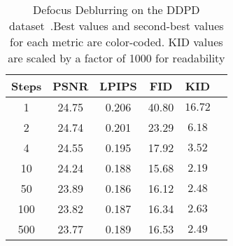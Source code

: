 \begin{table}[ht]
\small
\setlength{\tabcolsep}{3pt}
\centering
\caption{Defocus Deblurring on the DDPD dataset~\citep{abuolaim2020defocus}.\colorbox{red!15}{Best values} and \colorbox{blue!15}{second-best values} for each metric are color-coded. KID values are scaled by a factor of 1000 for readability}
\label{table:ddpd_results}
\begin{tabular}{cccccc}
\toprule
Steps	& PSNR	& LPIPS	    & FID & KID \\ \midrule
1	& \colorbox{red!15}{24.75}	& 0.206	& 40.80	& $16.72$\\
2	& \colorbox{blue!15}{24.74}	& 0.201	& 23.29	& $6.18$ \\
4	& 24.55	& 0.195	& 17.92	& $3.52$ \\
10	& 24.24	& 0.188	& \colorbox{red!15}{15.68}	& \colorbox{red!15}{$2.19$} \\	
50	& 23.89	& \colorbox{red!15}{0.186}	& \colorbox{blue!15}{16.12}	& \colorbox{blue!15}{$2.48$} \\
100	& 23.82	& \colorbox{blue!15}{0.187}	& 16.34	& $2.63$ \\
500	& 23.77	& 0.189	& 16.53	& $2.49$ \\	
\bottomrule

\end{tabular}
\end{table}
